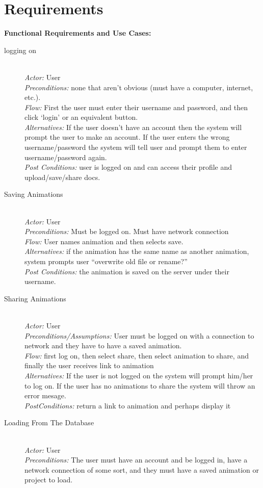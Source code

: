 \documentclass[12pt]{article}
\begin{document}
\section{Requirements}
\textbf{Functional Requirements and Use Cases:}
\begin{description}
\item[logging on] \hfill\\
   \textit{Actor:} User\\
  \textit{Preconditions:} none that aren’t obvious (must have a computer, internet, etc.).\\
  \textit{Flow:} First the user must enter their username and password, and then click ‘login’ or an equivalent button.\\
\textit{Alternatives:} If the user doesn’t have an account then the system will prompt the user to make an account. If the user enters the wrong username/password the system will tell user and prompt them to enter username/password again.\\
\textit{Post Conditions:}
    user is logged on and can access their profile and upload/save/share docs.
\item[Saving Animations]\hfill\\
\textit{Actor:} User\\
\textit{Preconditions:} Must be logged on. Must have network connection\\
\textit{Flow:} User names animation and then selects save.\\
\textit{Alternatives:} if the animation has the same name as another animation, system prompts user “overwrite old file or rename?”\\
\textit{Post Conditions:} the animation is saved on the server under their username.\\
\item[Sharing Animations]\hfill\\
\textit{Actor:} User\\
\textit{Preconditions/Assumptions:} User must be logged on with a connection to network and they have to have a saved animation.\\
\textit{Flow:} first log on, then select share, then select animation to share, and finally the user receives link to animation\\
\textit{Alternatives:} If the user is not logged on the system will prompt him/her to log on. If the user has no animations to share the system will throw an error mesage.\\
\textit{PostConditions:} return a link to animation and perhaps display it\\
\item[Loading From The Database]\hfill\\
\textit{Actor:} User\\
\textit{Preconditions:} The user must have an account and be logged in, have a network connection of some sort, and they must have a saved animation or project to load.\\


\end{description}
\end{document}
